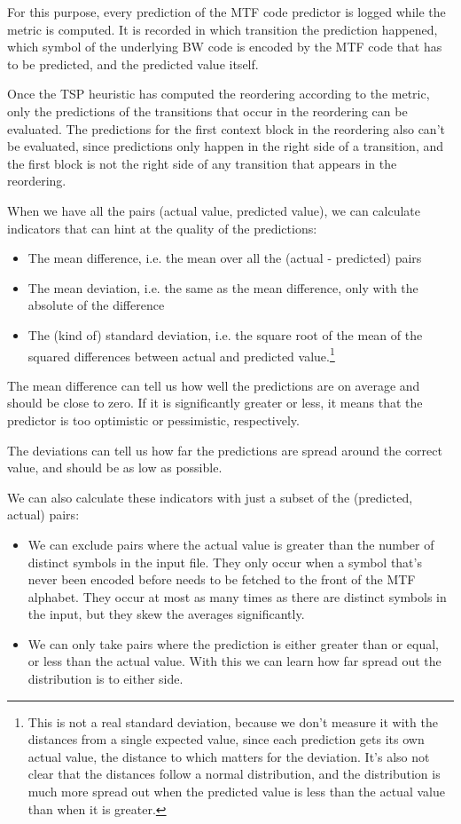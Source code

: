 \documentclass[a4paper]{scrreprt}
\begin{document}
For this purpose, every prediction of the MTF code predictor is logged while the
metric is computed. It is recorded in which transition the prediction happened,
which symbol of the underlying BW code is encoded by the MTF code that has to be
predicted, and the predicted value itself.

Once the TSP heuristic has computed the reordering according to the metric,
only the predictions of the transitions that occur in the reordering can be
evaluated. The predictions for the first context block in the reordering also
can't be evaluated, since predictions only happen in the right side of a
transition, and the first block is not the right side of any transition that
appears in the reordering.


When we have all the pairs (actual value, predicted value), we can calculate
indicators that can hint at the quality of the predictions:
\begin{itemize}
  \item The mean difference, i.e. the mean over all the (actual - predicted)
  pairs
  \item The mean deviation, i.e. the same as the mean difference, only with the
  absolute of the difference
  \item The (kind of) standard deviation, i.e. the square root of the mean of
  the squared differences between actual and predicted value.\footnote{This is
  not a real standard deviation, because we don't measure it with the distances
  from a single expected value, since each prediction gets its own actual
  value, the distance to which matters for the deviation. It's also not clear
  that the distances follow a normal distribution, and the distribution is much
  more spread out when the predicted value is less than the actual value than
  when it is greater.}
\end{itemize}

The mean difference can tell us how well the predictions are on average and
should be close to zero. If it is significantly greater or less, it means that
the predictor is too optimistic or pessimistic, respectively.

The deviations can tell us how far the predictions are spread around the correct
value, and should be as low as possible.

We can also calculate these indicators with just a subset of the
(predicted, actual) pairs:
\begin{itemize}
  \item We can exclude pairs where the actual value is
  greater than the number of distinct symbols in the input file. They only occur
  when a symbol that's never been encoded before needs to be fetched to the
  front of the MTF alphabet. They occur at most as many times as there are
  distinct symbols in the input, but they skew the averages significantly.
  \item We can only take pairs where the prediction is either greater than or
  equal, or less than the actual value. With this we can learn how far spread
  out the distribution is to either side.
\end{itemize}
\end{document}

